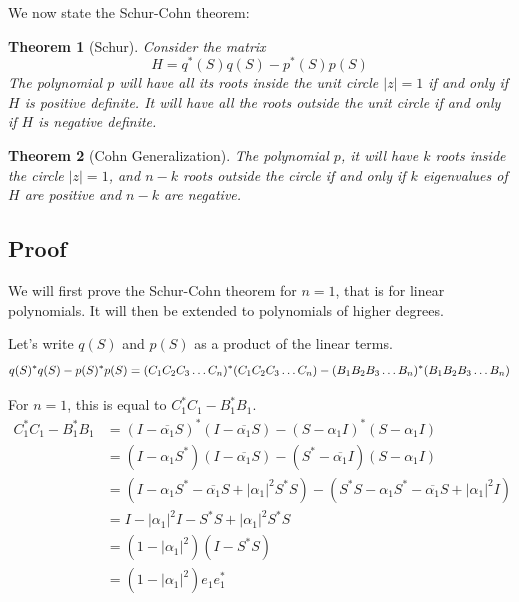 \documentclass[twofold]{article}
\newcommand*\conj[1]{\overline{#1}}
\newcommand*\adj[1]{#1^*}
\newcommand*\abs[1]{\left \vert #1 \right\vert}
\theoremstyle{plain}
\newtheorem{theorem}{Theorem}
\theoremstyle{definition}
\theoremstyle{remark}
\begin{document}
We now state the Schur-Cohn theorem:

\begin{theorem} [Schur] Consider the matrix  \[H = \adj{q}(S) q(S) - \adj{p}(S) p(S)\] The polynomial \(p\) will have all its roots inside the unit circle \(|z| = 1\) if and only if \(H\) is positive definite. It will have all the roots outside the unit circle if and only if \(H\) is negative definite. \end{theorem}

\begin{theorem} [Cohn Generalization] The polynomial \(p\), it will have \(k\) roots inside the circle \(|z| = 1\), and \(n-k\) roots outside the circle if and only if \(k\) eigenvalues of \(H\) are positive and \(n-k\) are negative. \end{theorem}

\subsection{Proof}

We will first prove the Schur-Cohn theorem for \(n =1\), that is for linear polynomials. It will then be extended to polynomials of higher degrees.


Let's write \(q(S)\) and \(p(S)\) as a product of the linear terms. 
\[\adj{q(S)} q(S) - \adj{p(S)} p(S) \\= \adj{(C_1C_2C_3 \ldots C_n)}(C_1C_2C_3\ldots C_n) - \adj{(B_1B_2B_3\ldots B_n)} (B_1B_2B_3\ldots B_n)\]

For \(n =1\), this is equal to \(\adj{C_1} C_1 - \adj{B_1} B_1\). 
\begin{equation*}
\begin{split}
  \adj{C_1}C_1 - \adj{B_1} B_1  & = \adj{(I - \conj{\alpha_1}S)} (I - \conj{\alpha_1}S) - \adj{(S - \alpha_1 I)} (S - \alpha_1 I) \\
& = (I - \alpha_1\adj{S}) (I - \conj{\alpha_1}S) - (\adj{S} - \conj{\alpha_1} I) (S - \alpha_1 I) \\
 & = (I - \alpha_1\adj{S} - \conj{\alpha_1}S + \abs{\alpha_1}^2 \adj{S} S) - (\adj{S} S - \alpha_1 \adj{S} - \conj{\alpha_1} S + \abs{\alpha_1}^2I)\\
& = I - \abs{\alpha_1}^2 I - \adj{S} S + \abs{\alpha_1}^2 \adj{S} S \\
& = (1 - \abs{\alpha_1}^2) (I - \adj{S} S) \\
& = (1 - \abs{\alpha_1}^2) e_1 \adj{e_1} 
\end{split}
\end{equation*}
\end{document}
